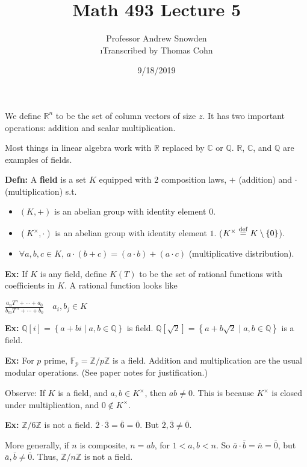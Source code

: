\documentclass[10pt,letterpaper]{article}
\author{Professor Andrew Snowden\\ \small\i{Transcribed by Thomas Cohn}}
\title{Math 493 Lecture 5}
\date{9/18/2019} %
\newcommand{\n}{\hfill\break}
\newcommand{\up}{\vspace{-\baselineskip}}
\newcommand{\hangblock}[2]{\par\noindent\settowidth{\hangindent}{\textbf{#1: }}\textbf{#1: }\!\!\!#2}
\newcommand{\defn}[1]{\hangblock{Defn}{#1}}
\newcommand{\ex}[1]{\hangblock{Ex}{#1}}
\newcommand{\ptxt}[1]{\textrm{\textnormal{#1}}}
\newcommand{\inlineeq}[1]{\centerline{$\displaystyle #1$}}
\newcommand{\set}[1]{\left\{#1\right\}}
\newcommand{\integers}{\mathbb{Z}}
\newcommand{\Z}{\integers}
\newcommand{\rationals}{\mathbb{Q}}
\newcommand{\Q}{\rationals}
\newcommand{\reals}{\mathbb{R}}
\newcommand{\R}{\reals}
\newcommand{\complex}{\mathbb{C}}
\newcommand{\C}{\complex}
\newcommand{\cut}{\setminus}
\newcommand{\st}{s.t.}
\newcommand{\eqdef}{\overset{\ptxt{def}}{=}}
\begin{document}
\maketitle
\setlength\RaggedRightParindent{\parindent}
\RaggedRight

\par\noindent
We define $\R^{n}$ to be the set of column vectors of size $z$. It has two important operations: addition and scalar multiplication.\n

\par\noindent
Most things in linear algebra work with $\R$ replaced by $\C$ or $\Q$. $\R$, $\C$, and $\Q$ are examples of fields.\n

\defn{
	A \textbf{field} is a set $K$ equipped with $2$ composition laws, $+$ (addition) and $\cdot$ (multiplication) \st{}
	\begin{itemize}
		\item $(K,+)$ is an abelian group with identity element $0$.
		\item $(K^{\times},\cdot)$ is an abelian group with identity element $1$. ($K^{\times}\eqdef{}K\cut\set{0}$).
		\item $\forall{}a,b,c\in{}K$, $a\cdot(b+c)=(a\cdot{}b)+(a\cdot{}c)$ (multiplicative distribution).
	\end{itemize}\up\n
}

\ex{
	If $K$ is any field, define $K(T)$ to be the set of rational functions with coefficients in $K$. A rational function looks like\n
	\inlineeq{
		\frac{a_{n}T^{n}+\cdots+a_{0}}{b_{m}T^{m}+\cdots+b_{0}}\quad{}a_{i},b_{j}\in{}K
	}\n
}

\ex{
	$\Q[i]=\set{a+bi\mid{}a,b\in\Q}$ is field.\n
	$\Q[\sqrt{2}]=\set{a+b\sqrt{2}\mid{}a,b\in\Q}$ is a field.\n
}

\ex{
	For $p$ prime, $\mathbb{F}_{p}=\Z/p\Z$ is a field. Addition and multiplication are the usual modular operations.\n
	(See paper notes for justification.)
}

\par\noindent
Observe: If $K$ is a field, and $a,b\in{}K^{\times}$, then $ab\ne{}0$. This is because $K^{\times}$ is closed under multiplication, and $0\not\in{}K^{\times}$.\n

\ex{
	$\Z/6\Z$ is not a field.\n
	$\bar{2}\cdot\bar{3}=\bar{6}=\bar{0}$. But $\bar{2},\bar{3}\ne\bar{0}$.\n
}

\par\noindent
More generally, if $n$ is composite, $n=ab$, for $1<a,b<n$. So $\bar{a}\cdot\bar{b}=\bar{n}=\bar{0}$, but $\bar{a},\bar{b}\ne\bar{0}$.\n
Thus, $\Z/n\Z$ is not a field.\n
\end{document}
